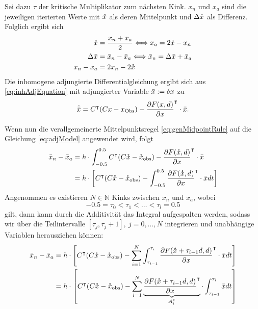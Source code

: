Sei dazu $\tau$ der kritische Multiplikator zum nächsten Kink. $x_n$ und $x_a$ sind die jeweiligen iterierten Werte mit $\mathring{x}$ als deren Mittelpunkt und $\Delta \mathring{x}$ als Differenz. Folglich ergibt sich 
\begin{align*}
\mathring{x} &= \frac{x_n+x_a}{2}\Longleftrightarrow x_a = 2\mathring{x} - x_n\\
\Delta \bar{x} &= \bar{x}_n - \bar{x}_a \Longleftrightarrow \bar{x}_n = \Delta \bar{x} + \bar{x}_a\\
x_n - x_a &= 2x_n - 2\mathring{x}\\
\end{align*}
Die inhomogene adjungierte Differentialgleichung ergibt sich aus \eqref{eq:inhAdjEquation} mit adjungierter Variable $\bar{x} := \delta x$ zu
\begin{equation}
\dot{\bar{x}} = C^\intercal(Cx - x_{\text{Obs}}) - \frac{\partial F(x,d)}{\partial x}^\intercal \cdot \bar{x}.
\label{eq:adjModel}
\end{equation}

Wenn nun die verallgemeinerte Mittelpunktsregel \eqref{eq:genMidpointRule} auf die Gleichung \eqref{eq:adjModel} angewendet wird, folgt
\begin{align*}
\bar{x}_n - \bar{x}_a &= h\cdot \int_{-0.5}^{0.5}C^\intercal(C\mathring{x}-\mathring{x}_{\text{obs}}) - \frac{\partial F(\mathring{x},d)}{\partial x}^\intercal \cdot \bar{x}\\
									&= h\cdot \left[C^\intercal(C\mathring{x}-\mathring{x}_{\text{obs}}) - \int_{-0.5}^{0.5} \frac{\partial F(\mathring{x} ,d)}{\partial x}^\intercal \cdot \bar{x} dt\right]\\
\end{align*}
Angenommen es existieren $N \in \mathbb{N}$ Kinks zwischen $x_n$ und $x_{a}$, wobei \[-0.5 = \tau_0 <\tau_1 <\ldots < \tau_l=0.5\] gilt, dann kann durch die Additivität das Integral aufgespalten werden, sodass wir über die Teilintervalle $[\tau_j,\tau_j+1],~ j=0,\ldots,N$ integrieren und unabhängige Variablen herausziehen können:
\begin{align*}
\bar{x}_n - \bar{x}_a &= h\cdot \left[ C^\intercal(C\mathring{x}-\mathring{x}_{\text{obs}}) - \sum_{i=1}^N \int_{\tau_{i-1}}^{\tau_{i}}\frac{\partial F(\mathring{x}+\tau_{i-1}d,d)}{\partial x}^\intercal \cdot \bar{x} dt\right]\\
									&= h\cdot \left[C^\intercal(C\mathring{x} -\mathring{x}_{\text{obs}}) - \sum_{i=1}^N \underbrace{\frac{\partial F(\mathring{x}+\tau_{i-1}d,d)}{\partial x}^\intercal }_{A_i^\intercal} \cdot \int_{\tau_{i-1}}^{\tau_{i}} \bar{x} dt\right]\\
\end{align*}

